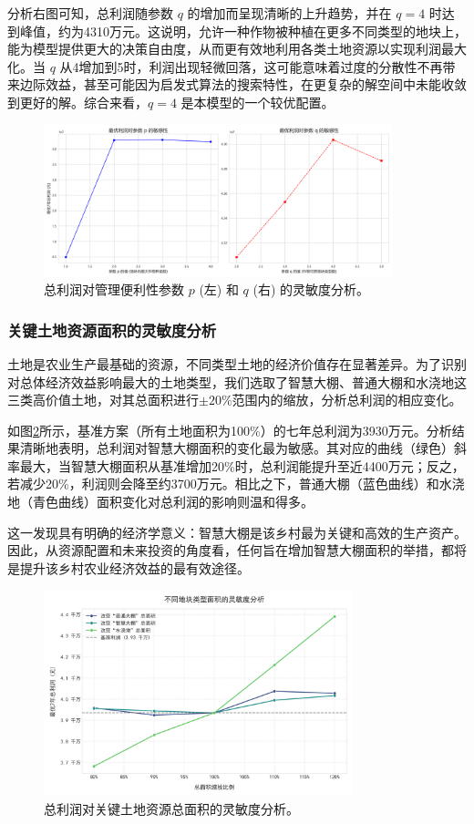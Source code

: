 分析右图可知，总利润随参数 $q$ 的增加而呈现清晰的上升趋势，并在 $q=4$ 时达到峰值，约为4310万元。这说明，允许一种作物被种植在更多不同类型的地块上，能为模型提供更大的决策自由度，从而更有效地利用各类土地资源以实现利润最大化。当 $q$ 从4增加到5时，利润出现轻微回落，这可能意味着过度的分散性不再带来边际效益，甚至可能因为启发式算法的搜索特性，在更复杂的解空间中未能收敛到更好的解。综合来看，$q=4$ 是本模型的一个较优配置。

\begin{figure}[H]
    \centering
    \includegraphics[width=0.9\textwidth]{figs/3问题一/pq灵敏度分析.png}
    \caption{总利润对管理便利性参数 $p$ (左) 和 $q$ (右) 的灵敏度分析。}
    \label{fig:pq_sensitivity}
\end{figure}

\subsubsection{关键土地资源面积的灵敏度分析}

土地是农业生产最基础的资源，不同类型土地的经济价值存在显著差异。为了识别对总体经济效益影响最大的土地类型，我们选取了智慧大棚、普通大棚和水浇地这三类高价值土地，对其总面积进行$\pm20\%$范围内的缩放，分析总利润的相应变化。

如图\ref{fig:area_sensitivity}所示，基准方案（所有土地面积为100\%）的七年总利润为3930万元。分析结果清晰地表明，总利润对智慧大棚面积的变化最为敏感。其对应的曲线（绿色）斜率最大，当智慧大棚面积从基准增加20\%时，总利润能提升至近4400万元；反之，若减少20\%，利润则会降至约3700万元。相比之下，普通大棚（蓝色曲线）和水浇地（青色曲线）面积变化对总利润的影响则温和得多。

这一发现具有明确的经济学意义：智慧大棚是该乡村最为关键和高效的生产资产。因此，从资源配置和未来投资的角度看，任何旨在增加智慧大棚面积的举措，都将是提升该乡村农业经济效益的最有效途径。

\begin{figure}[H]
    \centering
    \includegraphics[width=0.8\textwidth]{figs/3问题一/面积灵敏度分析.png}
    \caption{总利润对关键土地资源总面积的灵敏度分析。}
    \label{fig:area_sensitivity}
\end{figure}

